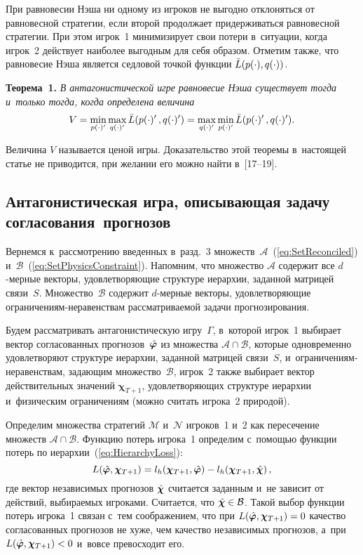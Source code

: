 \begin{multicols}{2}
При равновесии Нэша ни одному из игроков не выгодно отклоняться от
равновесной стратегии, если второй продолжает придерживаться
равновесной стратегии. При этом игрок~1 минимизирует свои потери в~ситуации, когда игрок~2 действует наиболее выгодным для себя
образом. Отметим также, что равновесие Нэша является седловой
точкой функции $\bar{L}(p(\cdot), q(\cdot))$.

\smallskip

\noindent
\textbf{Теорема~1.} %
\textit{В антагонистической игре равновесие Нэша существует тогда и~только
тогда, когда определена величина}
$$
    V = \min\limits_{p(\cdot)^{\prime}} \max\limits_{q(\cdot)^{\prime}} \bar{L}(p(\cdot)^{\prime}\,,
    q(\cdot)^{\prime}) =
    \max\limits_{q(\cdot)^{\prime}} \min\limits_{p(\cdot)^{\prime}} \bar{L}(p(\cdot)^{\prime}\,,
    q(\cdot)^{\prime}).
$$


Величина $V$ называется ценой игры. Доказательство этой теоремы
в~настоящей статье не приводится, при желании его можно
найти в~[17--19].

\subsection{Антагонистическая игра, описывающая задачу согласования~прогнозов}

Вернемся к~рассмотрению введенных в~разд.~3
множеств~$\mathcal{A}$~(\ref{eq:SetReconciled})
и~$\mathcal{B}$~(\ref{eq:SetPhysicsConstraint}). Напомним, что множество
$\mathcal{A}$ содержит все $d$-мер\-ные векторы, удовлетворяющие структуре
иерархии, заданной матрицей связи~$S$. Множество~$\mathcal{B}$ содержит
$d$-мер\-ные векторы, удовлетворяющие огра\-ни\-че\-ни\-ям-не\-ра\-вен\-ст\-вам
рассматриваемой задачи прогнозирования.

Будем рассматривать антагонистическую иг\-ру~$\Gamma$, в~которой
игрок~1 выбирает вектор согласованных прогнозов~$\hat{\boldsymbol{\varphi}}$ из
множества $\mathcal{A} \cap \mathcal{B}$, которые одновременно удовлетворяют
структуре иерархии, заданной матрицей связи~$S$,
и~огра\-ни\-че\-ни\-ям-не\-ра\-вен\-ст\-вам,
задающим множество~$\mathcal{B}$, игрок~2 также
выбирает вектор действительных значений $\boldsymbol{\chi}_{T+1}$,
удовлетворяющих структуре иерархии и~физическим ограничениям
(можно считать игрока~2 природой).

Определим множества стратегий $\mathcal{M}$ и~$\mathcal{N}$ игроков~1 и~2 как
пересечение множеств $\mathcal{A} \cap \mathcal{B}$. Функцию потерь игрока~1
определим с~помощью функции потерь по иерархии~(\ref{eq:HierarchyLoss}):
$$
    L(\hat{\boldsymbol{\varphi}}, \boldsymbol{\chi}_{T+1}) = l_h(\boldsymbol{\chi}_{T+1}, \hat{\boldsymbol{\varphi}}) - l_h(\boldsymbol{\chi}_{T+1}, \hat{\boldsymbol{\chi}})\,,
$$
где вектор независимых прогнозов $\hat{\boldsymbol{\chi}}$ считается заданным и~не
зависит от действий, выбираемых игроками. Считается, что $\hchi
\hm\in \mathcal{B}$. Такой выбор функции потерь игрока~1 связан с~тем
соображением, что при $L(\hphi, \boldsymbol{\chi}_{T+1}) \hm= 0$
качество согласованных прогнозов не хуже, чем качество независимых
прогнозов, а~при $L(\hphi, \boldsymbol{\chi}_{T+1}) \hm< 0$ и~вовсе
превосходит его.


\end{multicols}
